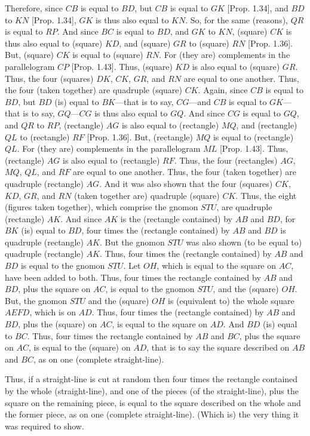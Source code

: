 \begin{Parallel}{}{}
{Therefore, since $CB$ is equal to $BD$, but $CB$ is equal to $GK$ [Prop. 1.34], and $BD$ to
$KN$ [Prop. 1.34], $GK$ is thus also equal to $KN$. So, for the same (reasons), $QR$ is equal
to $RP$. And since $BC$ is equal to $BD$, and $GK$ to $KN$, (square) $CK$ is thus
also equal to (square) $KD$, and (square) $GR$ to (square) $RN$ [Prop. 1.36]. But,
(square) $CK$ is equal to (square) $RN$. For (they are) complements
in the parallelogram $CP$ [Prop. 1.43]. Thus, (square) $KD$ is also equal
to (square) $GR$. Thus, the four (squares)
$DK$, $CK$, $GR$, and $RN$ are equal to one another. Thus, the four (taken
together) are quadruple (square) $CK$. Again, since $CB$ is equal to $BD$, but
$BD$ (is) equal to $BK$---that is to say, $CG$---and $CB$ is equal to $GK$---that is
to say, $GQ$---$CG$ is thus also equal to $GQ$. And since
$CG$ is equal to $GQ$, and $QR$ to $RP$, (rectangle) $AG$ is also equal to
(rectangle) $MQ$, and (rectangle) $QL$ to (rectangle) $RF$ [Prop. 1.36]. But, (rectangle)
$MQ$ is equal to (rectangle) $QL$. For (they are) complements in the parallelogram $ML$ [Prop. 1.43]. Thus, 
(rectangle) $AG$ is also equal  to (rectangle) $RF$. Thus, the four (rectangles) $AG$, $MQ$, $QL$, and $RF$ are equal
to one another. Thus, the four (taken together)
 are quadruple (rectangle)
$AG$. And it was also shown that the four (squares)
$CK$, $KD$, $GR$, and $RN$ (taken together are) quadruple (square) $CK$. 
Thus, the eight (figures taken together), which comprise the gnomon $STU$,
are quadruple (rectangle) $AK$. And since $AK$ is the (rectangle contained)
by $AB$ and $BD$, for $BK$ (is) equal to $BD$, four times the (rectangle contained)
by $AB$ and $BD$ is quadruple (rectangle) $AK$. But the gnomon $STU$ was also shown (to be equal to) quadruple (rectangle)
$AK$. Thus, four times the
(rectangle contained) by $AB$ and $BD$ is equal to the gnomon $STU$. 
Let $OH$, which is equal to the square on $AC$,  have been added to both.  
Thus, four times  the
rectangle contained by $AB$ and $BD$, plus the square on $AC$, is equal to
the gnomon $STU$, and the (square) $OH$. But, the  gnomon $STU$
and the (square) $OH$ is (equivalent to) the whole square $AEFD$, which is on
$AD$. Thus, four times the (rectangle contained) by $AB$ and $BD$, plus
the (square) on $AC$, is equal to the square on $AD$.
And $BD$ (is) equal to $BC$. Thus, four times the rectangle contained by $AB$ and $BC$, plus the square on $AC$, is equal to the (square) on $AD$, that is to
say the square described on $AB$ and $BC$,  as on one (complete straight-line).

Thus, if a straight-line is cut at random then four times the rectangle contained
by the whole (straight-line), and one of the pieces (of the straight-line), plus the square on the remaining piece,
is equal to  the square described on the whole and the former piece, as
on one (complete straight-line). (Which is) the very thing it was required to show.}
\end{Parallel}


